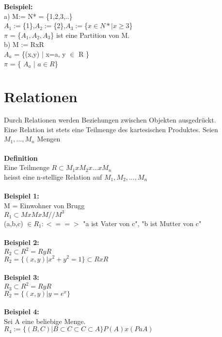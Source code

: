 \documentclass[11pt,a4paper]{article}
\begin{document}
\textbf{Beispiel:}\\
a) M:= N* = \{1,2,3,..\} \\
$A_1 := $\{1\},$ A_2 := $\{2\},$ A_3 := $\{$x \in N* | x \geq 3$\} \\
$\pi$ = \{$A_1,A_2,A_3$\} ist eine Partition von M.\\
b) M := RxR \\
$A_a$ = \{(x,y) | x=a, y $\in$ R \}\\

$\pi$ = \{ $A_a $ | $a \in R $\}

\section{Relationen}
Durch Relationen werden Beziehungen zwischen Objekten ausgedrückt.\\
Eine Relation ist stets eine Teilmenge des kartesischen Produktes.
Seien $M_1,...,M_n$ Mengen\\\\

\textbf{Definition}\\
Eine Teilmenge $ R \subset M_1 x M_2 x ... x M_n$\\
heisst eine n-stellige Relation auf $M_1, M_2,...,M_n$\\\\

\textbf{Beispiel 1:}\\
M = { Einwohner von Brugg }\\
$R_1 \subset MxMxM // M^3 $\\
(a,b,c) $ \in R_1 : <==> $ "a ist Vater von c", "b ist Mutter von c"\\\\

\textbf{Beispiel 2:}\\
$R_2 \subset R^2 = RyR$\\
$R_2 = \{(x,y) | x^2+y^2=1\} \subset RxR$\\\\

\textbf{Beispiel 3:}\\
$R_3 \subset R^2 = RyR$\\
$R_2 = \{(x,y) | y=e^x\}$\\\\

\textbf{Beispiel 4:}\\
Sei A eine beliebige Menge.\\
$R_4 := \{(B,C) | B \subset C \subset C \subset A\} P(A)x(PaA)$\\
\end{document}
